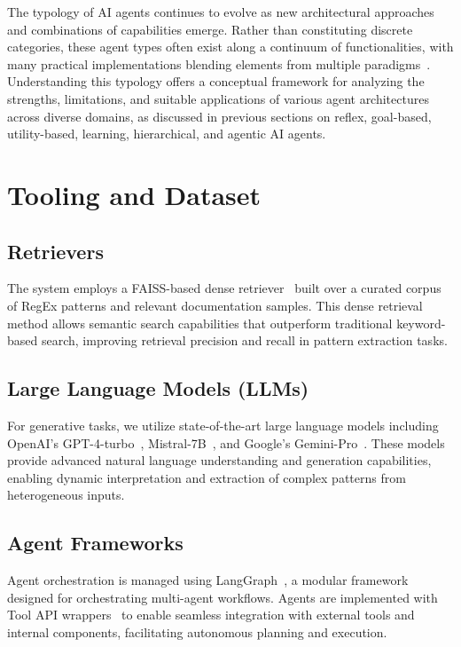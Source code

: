 The typology of AI agents continues to evolve as new architectural approaches and combinations of capabilities emerge. Rather than constituting discrete categories, these agent types often exist along a continuum of functionalities, with many practical implementations blending elements from multiple paradigms~\cite{russell2010aima,AWS2024, IBM2024}. Understanding this typology offers a conceptual framework for analyzing the strengths, limitations, and suitable applications of various agent architectures across diverse domains, as discussed in previous sections on reflex, goal-based, utility-based, learning, hierarchical, and agentic AI agents.


\section{Tooling and Dataset}

\subsection{Retrievers}
The system employs a FAISS-based dense retriever~\cite{johnson2019billion} built over a curated corpus of RegEx patterns and relevant documentation samples. This dense retrieval method allows semantic search capabilities that outperform traditional keyword-based search, improving retrieval precision and recall in pattern extraction tasks.

\subsection{Large Language Models (LLMs)}
For generative tasks, we utilize state-of-the-art large language models including OpenAI's GPT-4-turbo~\cite{openai2023gpt4}, Mistral-7B~\cite{mistral2023}, and Google’s Gemini-Pro~\cite{google2024gemini}. These models provide advanced natural language understanding and generation capabilities, enabling dynamic interpretation and extraction of complex patterns from heterogeneous inputs.

\subsection{Agent Frameworks}
Agent orchestration is managed using LangGraph~\cite{langgraph2024}, a modular framework designed for orchestrating multi-agent workflows. Agents are implemented with Tool API wrappers~\cite{chen2023toolformer} to enable seamless integration with external tools and internal components, facilitating autonomous planning and execution.

